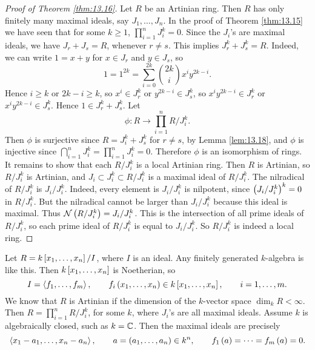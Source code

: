 \begin{proof}[Proof of Theorem \ref{thm:13.16}]
Let $ R $ be an Artinian ring. Then $ R $ has only finitely many maximal ideals, say $ J_1, \dots, J_n $. In the proof of Theorem \ref{thm:13.15} we have seen that for some $ k \ge 1 $, $ \prod_{i = 1}^n J_i^k = 0 $. Since the $ J_i $'s are maximal ideals, we have $ J_r + J_s = R $, whenever $ r \ne s $. This implies $ J_r^k + J_s^k = R $. Indeed, we can write $ 1 = x + y $ for $ x \in J_r $ and $ y \in J_s $, so
$$ 1 = 1^{2k} = \sum_{i = 0}^{2k} \binom{2k}{i}x^iy^{2k - i}. $$
Hence $ i \ge k $ or $ 2k - i \ge k $, so $ x^i \in J_r^k $ or $ y^{2k - i} \in J_s^k $, so $ x^iy^{2k - i} \in J_r^k $ or $ x^iy^{2k - i} \in J_s^k $. Hence $ 1 \in J_r^k + J_s^k $. Let
$$ \phi : R \to \prod_{i = 1}^n R / J_i^k. $$
Then $ \phi $ is surjective since $ R = J_i^k + J_s^k $ for $ r \ne s $, by Lemma \ref{lem:13.18}, and $ \phi $ is injective since $ \bigcap_{i = 1}^n J_i^k = \prod_{i = 1}^n J_i^k = 0 $. Therefore $ \phi $ is an isomorphism of rings. It remains to show that each $ R / J_i^k $ is a local Artinian ring. Then $ R $ is Artinian, so $ R / J_i^k $ is Artinian, and $ J_i \subset J_i^k \subset R / J_i^k $ is a maximal ideal of $ R / J_i^k $. The nilradical of $ R / J_i^k $ is $ J_i / J_i^k $. Indeed, every element is $ J_i / J_i^k $ is nilpotent, since $ \br{J_i / J_i^k}^k = 0 $ in $ R / J_i^k $. But the nilradical cannot be larger than $ J_i / J_i^k $ because this ideal is maximal. Thus $ \NNN\br{R / J_i^k} = J_i / J_i^k $. This is the intersection of all prime ideals of $ R / J_i^k $, so each prime ideal of $ R / J_i^k $ is equal to $ J_i / J_i^k $. So $ R / J_i^k $ is indeed a local ring.
\end{proof}

\begin{example*}
Let $ R = k\sbr{x_1, \dots, x_n} / I $, where $ I $ is an ideal. Any finitely generated $ k $-algebra is like this. Then $ k\sbr{x_1, \dots, x_n} $ is Noetherian, so
$$ I = \abr{f_1, \dots, f_m}, \qquad f_i\br{x_1, \dots, x_n} \in k\sbr{x_1, \dots, x_n}, \qquad i = 1, \dots, m. $$
We know that $ R $ is Artinian if the dimension of the $ k $-vector space $ \dim_k R < \infty $. Then $ R = \prod_{i = 1}^n R / J_i^k $, for some $ k $, where $ J_i $'s are all maximal ideals. Assume $ k $ is algebraically closed, such as $ k = \mathbb{C} $. Then the maximal ideals are precisely
$$ \abr{x_1 - a_1, \dots, x_n - a_n}, \qquad a = \br{a_1, \dots, a_n} \in k^n, \qquad f_1\br{a} = \dots = f_m\br{a} = 0. $$
\end{example*}

